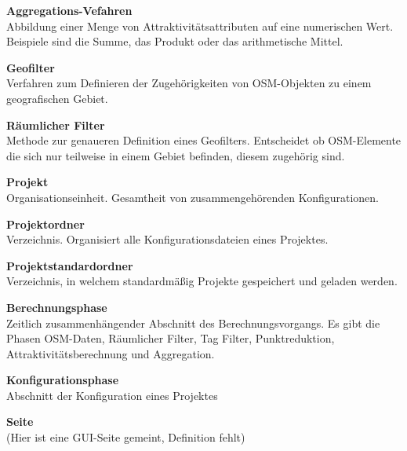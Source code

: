 \documentclass[parskip=full]{scrartcl} %
\begin{document}
\textbf{Aggregations-Vefahren}\\
Abbildung einer Menge von Attraktivitätsattributen auf eine numerischen Wert. Beispiele sind die Summe, das Produkt oder das arithmetische Mittel.

\textbf{Geofilter}\\
Verfahren zum Definieren der Zugehörigkeiten von OSM-Objekten zu einem geografischen Gebiet.

\textbf{Räumlicher Filter}\\
Methode zur genaueren Definition eines Geofilters. Entscheidet ob OSM-Elemente die sich nur teilweise in einem Gebiet befinden, diesem zugehörig sind.

\textbf{Projekt}\\
Organisationseinheit. Gesamtheit von zusammengehörenden Konfigurationen.

\textbf{Projektordner}\\
Verzeichnis. Organisiert alle Konfigurationsdateien eines Projektes.

\textbf{Projektstandardordner}\\
Verzeichnis, in welchem standardmäßig Projekte gespeichert und geladen werden.

\textbf{Berechnungsphase}\\
Zeitlich zusammenhängender Abschnitt des Berechnungsvorgangs. Es gibt die Phasen OSM-Daten, Räumlicher Filter, Tag Filter, Punktreduktion, Attraktivitätsberechnung und Aggregation.

\textbf{Konfigurationsphase}\\
Abschnitt der Konfiguration eines Projektes

\textbf{Seite}\\
(Hier ist eine GUI-Seite gemeint, Definition fehlt)
\end{document}

